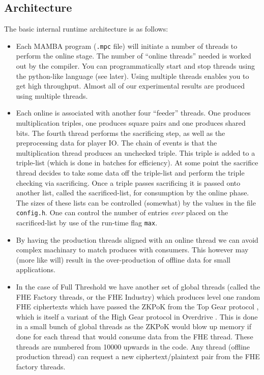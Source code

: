 \subsection{Architecture}
The basic internal runtime architecture is as follows:
\begin{itemize}
\item Each MAMBA program (\verb+.mpc+ file) will initiate a number of threads
to perform the online stage.
The number of ``online threads'' needed is worked out by the compiler. You
can programmatically start and stop threads using the python-like
language (see later).
Using multiple threads enables you to get high throughput. Almost all
of our experimental results are produced using multiple threads.
\item Each online is associated with another four ``feeder'' threads.
One produces multiplication triples, one produces square pairs
and one produces shared bits.
The fourth thread performs the sacrificing step, as well as
the preprocessing data for player IO.
The chain of events is that the multiplication thread produces
an unchecked triple. This triple is added to a triple-list (which is
done in batches for efficiency).
At some point the sacrifice thread decides to take some
data off the triple-list and perform the triple checking via
sacrificing.
Once a triple passes sacrificing it is passed onto another
list, called the sacrificed-list, for consumption by the online phase.
The sizes of these lists can be controlled (somewhat) by the
values in the file \verb+config.h+.
One can control the number of entries {\em ever}
placed on the sacrificed-list by use of the run-time flag \verb+max+.
\item By having the production threads aligned with an online
thread we can avoid complex machinary to match produces with
consumers. This however may (more like will) result in the 
over-production of offline data for small applications.
\item In the case of Full Threshold we have another set of global
threads (called the FHE Factory threads, or the FHE Industry) 
which produces level one random FHE ciphertexts which have passed 
the ZKPoK from the Top Gear protocol \cite{TopGear},
which is itself a variant of the High Gear protocol in Overdrive \cite{KPR}.
This is done in a small bunch of global threads as the ZKPoK would
blow up memory if done for each thread that would consume 
data from the FHE thread.
These threads are numbered from 10000 upwards in the code.
Any thread (offline production thread) can request a new
ciphertext/plaintext pair from the FHE factory threads.

\end{itemize}
